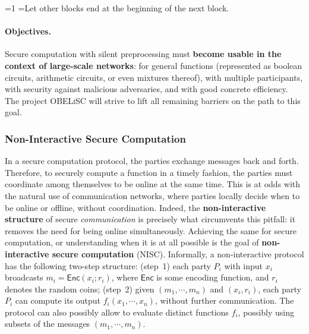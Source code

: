 \documentclass[oneside, a4paper, onecolumn, 11pt]{article}
\newcommand{\OBELiSC}{\textsc{OBELiSC}\xspace}
\newcommand{\Enc}{\mathsf{Enc}}
\newcounter{alphasect}
\def\alphainsection{0}
\newenvironment{alphasection}{%
  \ifnum\alphainsection=1%
    \errhelp={Let other blocks end at the beginning of the next block.}
    \errmessage{Nested Alpha section not allowed}
  \fi%
  \setcounter{alphasect}{0}
  \def\alphainsection{1}
}{%
  \setcounter{alphasect}{0}
  \def\alphainsection{0}
}%
\begin{document}
\begin{alphasection}
\paragraph{Objectives.} Secure computation with silent preprocessing must \textbf{become usable in the context of large-scale networks}: for general functions (represented as boolean circuits, arithmetic circuits, or even mixtures thereof), with multiple participants, with security against malicious adversaries, and with good concrete efficiency. The project \OBELiSC will strive to lift all remaining barriers on the path to this goal.

\subsubsection{Non-Interactive Secure Computation}
\label{subsec:ni}
In a secure computation protocol, the parties exchange messages back and forth. Therefore, to securely compute a function in a timely fashion, the parties must coordinate among themselves to be online at the same time. This is at odds with the natural use of communication networks, where parties locally decide when to be online or offline, without coordination. Indeed, the \textbf{non-interactive structure} of secure \emph{communication} is precisely what circumvents this pitfall: it removes the need for being online simultaneously. Achieving the same for secure computation, or understanding when it is at all possible is the goal of \textbf{non-interactive secure computation} (NISC). Informally, a non-interactive protocol has the following two-step structure: (step~1) each party $P_i$ with input $x_i$ broadcasts $m_i = \Enc(x_i;r_i)$, where $\Enc$ is some encoding function, and $r_i$ denotes the random coins; (step~2) given $(m_1, \cdots, m_n)$ and $(x_i,r_i)$, each party $P_i$ can compute its output $f_i(x_1, \cdots, x_n)$, without further communication. The protocol can also possibly allow to evaluate distinct functions $f_i$, possibly using subsets of the messages $(m_1, \cdots, m_n)$.


\end{alphasection}
\end{document}

